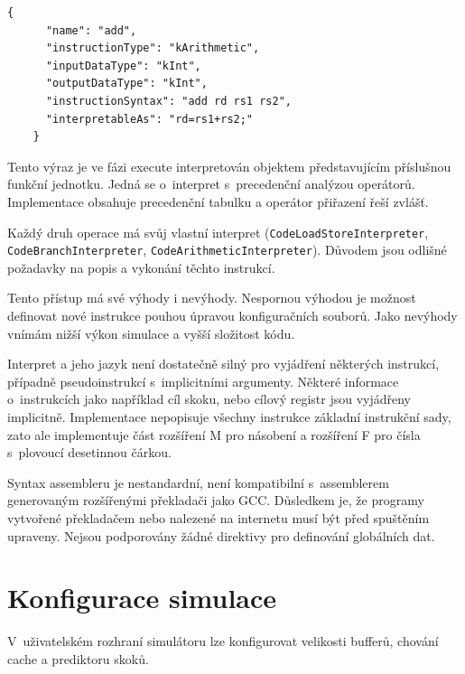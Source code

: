 \newpage

\begin{lstlisting}[caption={Popis instrukce \texttt{add}. Položka \texttt{interpretableAs} obsahuje matematický popis instrukce.},captionpos=b,label=code.1]
    {
      "name": "add",
      "instructionType": "kArithmetic",
      "inputDataType": "kInt",
      "outputDataType": "kInt",
      "instructionSyntax": "add rd rs1 rs2",
      "interpretableAs": "rd=rs1+rs2;"
    }
\end{lstlisting}

Tento výraz je ve fázi execute interpretován objektem představujícím příslušnou funkční jednotku.
Jedná se o~interpret s~precedenční analýzou operátorů.
Implementace obsahuje precedenční tabulku a operátor přiřazení řeší zvlášť.

Každý druh operace má svůj vlastní interpret (\texttt{Code\-Load\-Store\-Interpreter}, \texttt{Code\-Branch\-Interpreter}, \texttt{Code\-Arithmetic\-Interpreter}).
Důvodem jsou odlišné požadavky na popis a vykonání těchto instrukcí.

Tento přístup má své výhody i nevýhody.
Nespornou výhodou je možnost definovat nové instrukce pouhou úpravou konfiguračních souborů.
Jako nevýhody vnímám nižší výkon simulace a vyšší složitost kódu.

Interpret a jeho jazyk není dostatečně silný pro vyjádření některých instrukcí, případně pseudoinstrukcí s~implicitními argumenty.
Některé informace o~instrukcích jako například cíl skoku, nebo cílový registr jsou vyjádřeny implicitně.
Implementace nepopisuje všechny instrukce základní instrukční sady, zato ale implementuje část rozšíření M pro násobení a rozšíření F pro čísla s~plovoucí desetinnou čárkou.

Syntax assembleru je nestandardní, není kompatibilní s~assemblerem generovaným rozšířenými překladači jako GCC.
Důsledkem je, že programy vytvořené překladačem nebo nalezené na internetu musí být před spuštěním upraveny.
Nejsou podporovány žádné direktivy pro definování globálních dat.

\section{Konfigurace simulace}

V~uživatelském rozhraní simulátoru lze konfigurovat velikosti bufferů, chování cache a prediktoru skoků.

